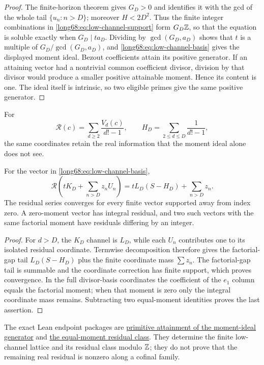 \documentclass[11pt]{article}
\newcommand{\Ser}{S}
\newcommand{\chn}[2]{V_{#1}(#2)}
\begin{document}
\begin{proof}
The finite-horizon theorem gives $G_D>0$ and identifies it with the gcd of the
whole tail $\{u_n:n>D\}$; moreover $H<2D^2$.  Thus the finite integer
combinations in \eqref{long68:eq:low-channel-support} form $G_D\mathbb{Z}$, so that the
equation is soluble exactly when $G_D\mid ta_D$.  Dividing by
$\gcd(G_D,a_D)$ shows that $t$ is a multiple of
$G_D/\gcd(G_D,a_D)$, and \eqref{long68:eq:low-channel-basis} gives the displayed
moment ideal.  Bezout coefficients attain its positive generator.  If an
attaining vector had a nontrivial common coefficient divisor, division by that
divisor would produce a smaller positive attainable moment.  Hence its content
is one.  The ideal itself is intrinsic, so two eligible primes give the same
positive generator.
\end{proof}

For
\[
 \mathcal R(c)=\sum_{d\ge2}\frac{\chn dc}{d!-1},\qquad
 H_D=\sum_{2\le d\le D}\frac1{d!-1},
\]
the same coordinates retain the real information that the moment ideal alone
does not see.

\begin{theorem}\label{long68:res:residual-transparency}
For the vector in \eqref{long68:eq:low-channel-basis},
\[
 \mathcal R\!\left(tK_D+\sum_{n>D}z_nU_n\right)
 =tL_D(\Ser-H_D)+\sum_{n>D}z_n.
\]
The residual series converges for every finite vector supported away from
index zero.  A zero-moment vector has integral residual, and two such vectors
with the same factorial moment have residuals differing by an integer.
\end{theorem}

\begin{proof}
For $d>D$, the $K_D$ channel is $L_D$, while each $U_n$ contributes one to its
isolated residual coordinate.  Termwise decomposition therefore gives the
factorial-gap tail $L_D(\Ser-H_D)$ plus the finite coordinate mass
$\sum z_n$.  The factorial-gap tail is summable and the coordinate correction
has finite support, which proves convergence.  In the full divisor-basis
coordinates the coefficient of the $e_1$ column equals the factorial moment;
when that moment is zero only the integral coordinate mass remains.  Subtracting
two equal-moment identities proves the last assertion.
\end{proof}

The exact Lean endpoint packages are
\href{https://github.com/wcook04/plectis-erdos/blob/f20f727ae44d6dc3b24036bf63118b8fe591912e/ErdosProblems/Erdos68/PaperCompleteMomentIdeal.lean#L242}{primitive attainment of the moment-ideal generator} and
\href{https://github.com/wcook04/plectis-erdos/blob/f20f727ae44d6dc3b24036bf63118b8fe591912e/ErdosProblems/Erdos68/PaperCompleteResidualIdentity.lean#L195}{the equal-moment residual class}.
They determine the finite low-channel lattice and its residual class modulo
$\mathbb{Z}$; they do not prove that the remaining real residual is nonzero along a
cofinal family.
\end{document}
